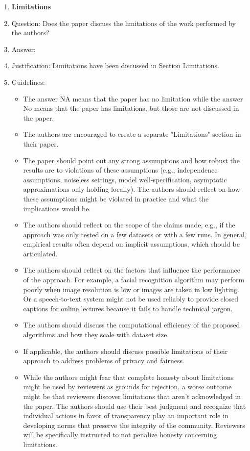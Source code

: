\documentclass{article}
\begin{document}
\begin{enumerate}
\item {\bf Limitations}
    \item[] Question: Does the paper discuss the limitations of the work performed by the authors?
    \item[] Answer: \answerYes{} %
    \item[] Justification: Limitations have been discussed in Section Limitations.
    \item[] Guidelines:
    \begin{itemize}
        \item The answer NA means that the paper has no limitation while the answer No means that the paper has limitations, but those are not discussed in the paper. 
        \item The authors are encouraged to create a separate "Limitations" section in their paper.
        \item The paper should point out any strong assumptions and how robust the results are to violations of these assumptions (e.g., independence assumptions, noiseless settings, model well-specification, asymptotic approximations only holding locally). The authors should reflect on how these assumptions might be violated in practice and what the implications would be.
        \item The authors should reflect on the scope of the claims made, e.g., if the approach was only tested on a few datasets or with a few runs. In general, empirical results often depend on implicit assumptions, which should be articulated.
        \item The authors should reflect on the factors that influence the performance of the approach. For example, a facial recognition algorithm may perform poorly when image resolution is low or images are taken in low lighting. Or a speech-to-text system might not be used reliably to provide closed captions for online lectures because it fails to handle technical jargon.
        \item The authors should discuss the computational efficiency of the proposed algorithms and how they scale with dataset size.
        \item If applicable, the authors should discuss possible limitations of their approach to address problems of privacy and fairness.
        \item While the authors might fear that complete honesty about limitations might be used by reviewers as grounds for rejection, a worse outcome might be that reviewers discover limitations that aren't acknowledged in the paper. The authors should use their best judgment and recognize that individual actions in favor of transparency play an important role in developing norms that preserve the integrity of the community. Reviewers will be specifically instructed to not penalize honesty concerning limitations.
    \end{itemize}


\end{enumerate}
\end{document}
